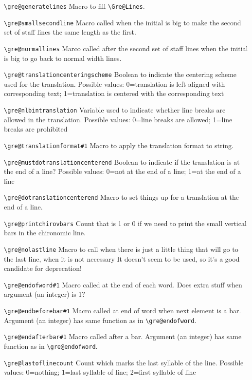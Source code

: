 \verb=\gre@generatelines=%
	Macro to fill \verb=\Gre@Lines=.

\verb=\gre@smallsecondline=%
	Macro called when the initial is big to make the second set of staff lines the same length as the first.

\verb=\gre@normallines=%
	Marco called after the second set of staff lines when the initial is big to go back to normal width lines.

\verb=\gre@translationcenteringscheme=%
	Boolean to indicate the centering scheme used for the translation.
	Possible values: 0=translation is left aligned with corresponding text; 1=translation is centered with the corresponding text

\verb=\gre@nlbintranslation=%
	Variable used to indicate whether line breaks are allowed in the translation.
	Possible values: 0=line breaks are allowed; 1=line breaks are prohibited

\verb=\gre@translationformat#1=%
	Macro to apply the translation format to string.

\verb=\gre@mustdotranslationcenterend=%
	Boolean to indicate if the translation is at the end of a line?
	Possible values: 0=not at the end of a line; 1=at the end of a line

\verb=\gre@dotranslationcenterend=%
	Macro to set things up for a translation at the end of a line.

\verb=\gre@printchirovbars=%
	Count that is 1 or 0 if we need to print the small vertical bars in the chironomic line.

\verb=\gre@nolastline=%
	Macro to call when there is just a little thing that will go to the last line, when it is not necessary
	It doesn't seem to be used, so it's a good candidate for deprecation!

\verb=\gre@endofword#1=%
	Macro called at the end of each word.  Does extra stuff when argument (an integer) is 1?

\verb=\gre@endbeforebar#1=%
	Macro called at end of word when next element is a bar.  Argument (an integer) has same function as in \verb=\gre@endofword=.

\verb=\gre@endafterbar#1=%
	Macro called after a bar.  Argument (an integer) has same function as in \verb=\gre@endofword=.

\verb=\gre@lastoflinecount=%
	Count which marks the last syllable of the line.
	Possible values: 0=nothing; 1=last syllable of line; 2=first syllable of line

